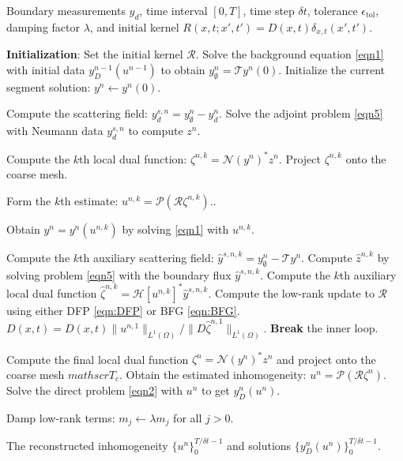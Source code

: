 \documentclass[onefignum,onetabnum]{siamart190516}
\numberwithin{equation}{section}
\begin{document}
\begin{algorithm}[hbt!]
\caption{The IDSM for the parabolic inverse problem}
\label{alg1}
\begin{algorithmic}[1]
\Require Boundary measurements $y_{d}$, time interval $[0, T]$, time step $\delta t$, tolerance $\epsilon_{\text{tol}}$, damping factor $\lambda$, and initial kernel $R(x,t;x',t')=D(x,t)\delta_{x,t}(x',t')$.

\State \textbf{Initialization}: Set the initial kernel $\mathcal{R}$.
 
\State Solve the background equation \eqref{eqn1} with initial data $y_{D}^{n-1}(u^{n-1})$ to obtain $y_{\emptyset}^{n}=\mathcal{T}y^{n}(0)$.
\State Initialize the current segment solution: $y^{n} \leftarrow y^{n}(0)$.

\State Compute the scattering field: $y^{s,n}_{d} = y_{\emptyset}^{n} - y_{d}^{n}$.
\State Solve the adjoint problem \eqref{eqn5} with Neumann data $y^{s,n}_{d}$ to compute $z^{n}$.

 
\State Compute the $k$th local dual function: $\zeta^{n,k} = \mathcal{N}(y^{n})^{*} z^{n}$.
\State Project $\zeta^{n,k}$ onto the coarse mesh. %

\State Form the $k$th estimate: $u^{n,k} = \mathcal{P}(\mathcal{R}\zeta^{n,k})$..

\State Obtain $y^{n}=y^{n}(u^{n,k})$ by solving \eqref{eqn1} with $u^{n,k}$.

\State Compute the $k$th auxiliary scattering field: $\hat{y}^{s,n,k} = y_{\emptyset}^{n} - \mathcal{T}y^{n}$.
\State Compute $\hat{z}^{n,k}$ by solving problem \eqref{eqn5} with the boundary flux $\hat{y}^{s,n,k}$.
\State Compute the $k$th auxiliary local dual function $\hat{\zeta}^{n,k} = \mathcal{H}[u^{n,k}]^{*} \hat{y}^{s,n,k}$.
\State Compute the low-rank update to $\mathcal{R}$ using either DFP \eqref{eqn:DFP} or BFG \eqref{eqn:BFG}.
\State $D(x,t)=D(x,t){\|u^{n,1}\|_{L^{1}(\Omega)}}/{\|D\hat{\zeta}^{n,1}\|_{L^{1}(\Omega)}}$.
\EndIf
{}
\State \textbf{Break} the inner loop.
\EndIf
\EndFor

\State Compute the final local dual function $\zeta^{n} = \mathcal{N}(y^{n})^{*} z^{n}$ and project onto the coarse mesh $mathscr{T}_{c}$.
\State Obtain the estimated inhomogeneity: $u^{n} = \mathcal{P}(\mathcal{R}\zeta^{n})$.
\State Solve the direct problem \eqref{eqn2} with $u^{n}$ to get $y_{D}^{n}(u^{n})$.

\State Damp low-rank terms: $m_{j} \leftarrow \lambda m_{j}$ for all $j>0$.
\EndFor

\State \Return The reconstructed inhomogeneity $\{u^{n}\}_{0}^{T/\delta t-1}$ and solutions $\{y_{D}^{n}(u^{n})\}_{0}^{T/\delta t-1}$.
\end{algorithmic}
\end{algorithm}
\end{document}
